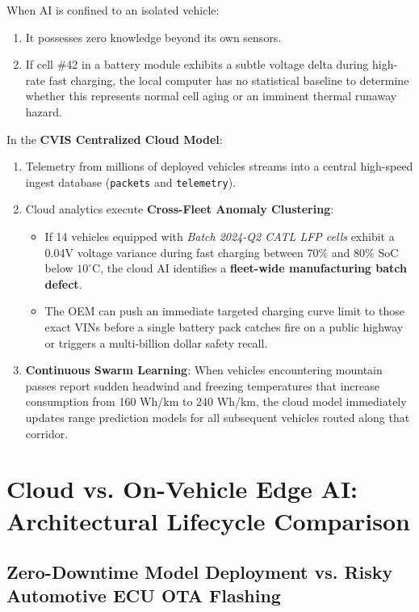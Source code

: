\documentclass[12pt,a4paper]{report}
\begin{document}
When AI is confined to an isolated vehicle:
\begin{enumerate}[leftmargin=1.5cm]
  \item It possesses zero knowledge beyond its own sensors.
  \item If cell \#42 in a battery module exhibits a subtle voltage delta during high-rate fast charging, the local computer has no statistical baseline to determine whether this represents normal cell aging or an imminent thermal runaway hazard.
\end{enumerate}

In the \textbf{CVIS Centralized Cloud Model}:
\begin{enumerate}[leftmargin=1.5cm]
  \item Telemetry from millions of deployed vehicles streams into a central high-speed ingest database (\texttt{packets} and \texttt{telemetry}).
  \item Cloud analytics execute \textbf{Cross-Fleet Anomaly Clustering}:
  \begin{itemize}
    \item If 14 vehicles equipped with \textit{Batch 2024-Q2 CATL LFP cells} exhibit a 0.04V voltage variance during fast charging between 70\% and 80\% SoC below $10^\circ\text{C}$, the cloud AI identifies a \textbf{fleet-wide manufacturing batch defect}.
    \item The OEM can push an immediate targeted charging curve limit to those exact VINs before a single battery pack catches fire on a public highway or triggers a multi-billion dollar safety recall.
  \end{itemize}
  \item \textbf{Continuous Swarm Learning}: When vehicles encountering mountain passes report sudden headwind and freezing temperatures that increase consumption from 160 Wh/km to 240 Wh/km, the cloud model immediately updates range prediction models for all subsequent vehicles routed along that corridor.
\end{enumerate}

\section{Cloud vs. On-Vehicle Edge AI: Architectural Lifecycle Comparison}

\subsection{Zero-Downtime Model Deployment vs. Risky Automotive ECU OTA Flashing}
\end{document}
